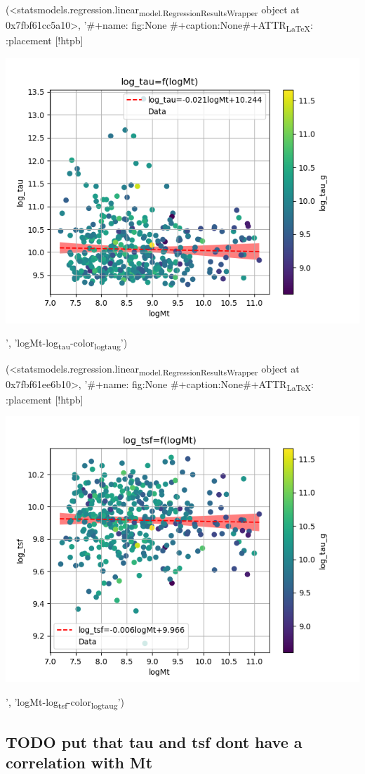 \documentclass[a4paper,twocolumn]{article}
\begin{document}
(<statsmodels.regression.linear\textsubscript{model.RegressionResultsWrapper} object at 0x7fbf61cc5a10>, '\#+name: fig:None \n\#+caption:None\n\#+ATTR\textsubscript{\LaTeX{}}: :placement [!htpb] \n\begin{center}
\includegraphics[width=.9\linewidth]{./figs/logMt-log_tau-color_log_tau_g.png}
\end{center}', 'logMt-log\textsubscript{tau}-color\textsubscript{log}\textsubscript{tau}\textsubscript{g}')

(<statsmodels.regression.linear\textsubscript{model.RegressionResultsWrapper} object at 0x7fbf61ee6b10>, '\#+name: fig:None \n\#+caption:None\n\#+ATTR\textsubscript{\LaTeX{}}: :placement [!htpb] \n\begin{center}
\includegraphics[width=.9\linewidth]{./figs/logMt-log_tsf-color_log_tau_g.png}
\end{center}', 'logMt-log\textsubscript{tsf}-color\textsubscript{log}\textsubscript{tau}\textsubscript{g}')

\subsection{{\bfseries\sffamily TODO} put that tau and tsf dont have a correlation with Mt}
\label{sec:org9a06924}

\pagebreak
\printbibliography
\end{document}
